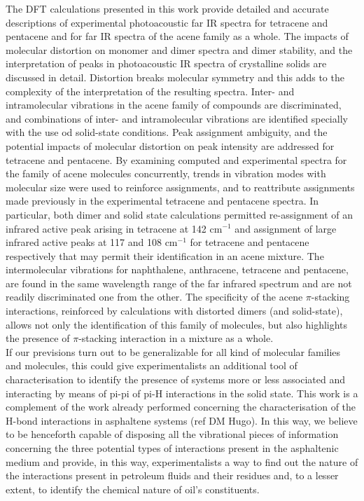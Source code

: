 The DFT calculations presented in this work provide detailed and accurate descriptions of experimental photoacoustic far IR spectra for tetracene and pentacene and for far IR spectra of the acene family as a whole.  The impacts of molecular distortion on monomer and dimer spectra and dimer stability, and the interpretation of peaks in photoacoustic IR spectra of crystalline solids are discussed in detail. Distortion breaks molecular symmetry and this adds to the complexity of the interpretation of the resulting spectra. Inter- and intramolecular vibrations in the acene family of compounds are discriminated, and combinations of inter- and intramolecular vibrations are identified specially with the use od solid-state conditions. Peak assignment ambiguity, and the potential impacts of molecular distortion on peak intensity are addressed for tetracene and pentacene. By examining computed and experimental spectra for the family of acene molecules concurrently, trends in vibration modes with molecular size were used to reinforce assignments, and to reattribute assignments made previously in the experimental tetracene and pentacene spectra. In particular, both dimer and solid state calculations permitted re-assignment of an infrared active peak arising in tetracene at 142 cm$^{-1}$ and assignment of large infrared active peaks at 117 and 108 cm$^{-1}$ for tetracene and pentacene respectively that may permit their identification in an acene mixture. The intermolecular vibrations for naphthalene, anthracene, tetracene and pentacene, are found in the same wavelength range of the far infrared spectrum and are not readily discriminated one from the other. The specificity of the acene $\pi$-stacking interactions, reinforced by calculations with distorted dimers (and solid-state), allows not only the identification of this family of molecules, but also highlights the presence of $\pi$-stacking interaction in a mixture as a whole.\\
 
If our previsions turn out to be generalizable for all kind of molecular families and molecules, this could give experimentalists an additional tool of characterisation to identify the presence of systems more or less associated and interacting by means of pi-pi of pi-H interactions in the solid state. This work is a complement of the work already performed concerning the characterisation of the H-bond interactions in asphaltene systems (ref DM Hugo). In this way, we believe to be henceforth capable of disposing all the vibrational pieces of information concerning the three potential types of interactions present in the asphaltenic medium and provide, in this way, experimentalists a way to find out the nature of the interactions present in petroleum fluids and their residues and, to a lesser extent, to identify the chemical nature of oil’s constituents. 
 
 





